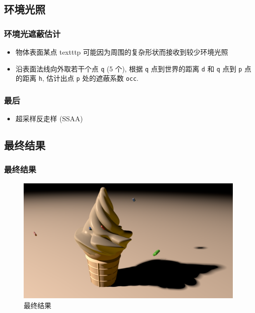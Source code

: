 \documentclass[aspectratio=169]{ctexbeamer} %
\begin{document}
\subsection{环境光照}
\begin{frame}
    \frametitle{环境光遮蔽估计}
    \begin{itemize}
        \item 物体表面某点 texttt{p} 可能因为周围的复杂形状而接收到较少环境光照
        \item 沿表面法线向外取若干个点 \texttt{q} (5 个), 根据 \texttt{q} 点到世界的距离 \texttt{d} 和 \texttt{q} 点到 \texttt{p} 点的距离 \texttt{h}, 估计出点 \texttt{p} 处的遮蔽系数 \texttt{occ}.
    \end{itemize}
\end{frame}

\begin{frame}
    \frametitle{最后}
    \begin{itemize}
        \item 超采样反走样 (SSAA)
    \end{itemize}
\end{frame}

\subsection{最终结果}
\begin{frame}
    \frametitle{最终结果}
    \begin{figure}[htbp]
        \centering
        \includegraphics[height=.75\textheight]{images/pre/full.pdf}
        \caption{最终结果}
        \label{fig:final}
    \end{figure}
\end{frame}
\end{document}
